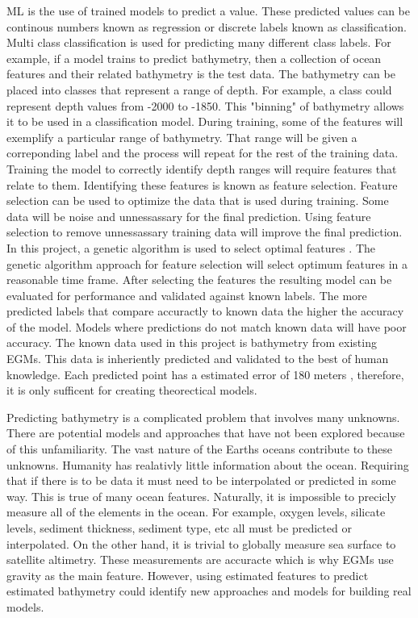 \par
\ac{ML} is the use of trained models to predict a value.
These predicted values can be continous numbers known as regression or discrete labels known as classification.
Multi class classification is used for predicting many different class labels.
For example, if a model trains to predict bathymetry, then a collection of ocean features and their related bathymetry is the test data.
The bathymetry can be placed into classes that represent a range of depth.
For example, a class could represent depth values from -2000 to -1850.
This "binning" of bathymetry allows it to be used in a classification model.
During training, some of the features will exemplify a particular range of bathymetry.
That range will be given a correponding label and the process will repeat for the rest of the training data.
Training the model to correctly identify depth ranges will require features that relate to them.
Identifying these features is known as feature selection.
Feature selection can be used to optimize the data that is used during training.
Some data will be noise and unnessassary for the final prediction.
Using feature selection to remove unnessassary training data will improve the final prediction.
In this project, a genetic algorithm is used to select optimal features \cite{yang1998feature}.
The genetic algorithm approach for feature selection will select optimum features in a reasonable time frame.
After selecting the features the resulting model can be evaluated for performance and validated against known labels.
The more predicted labels that compare accuractly to known data the higher the accuracy of the model.
Models where predictions do not match known data will have poor accuracy.
The known data used in this project is bathymetry from existing \ac{EGM}s.
This data is inheriently predicted and validated to the best of human knowledge.
Each predicted point has a estimated error of 180 meters \cite{becker2009global}, therefore, it is only sufficent for creating theorectical models.

\par
Predicting bathymetry is a complicated problem that involves many unknowns.
There are potential models and approaches that have not been explored because of this unfamiliarity.
The vast nature of the Earths oceans contribute to these unknowns.
Humanity has realativly little information about the ocean.
Requiring that if there is to be data it must need to be interpolated or predicted in some way.
This is true of many ocean features.
Naturally, it is impossible to precicly measure all of the elements in the ocean.
For example, oxygen levels, silicate levels, sediment thickness, sediment type, etc all must be predicted or interpolated.
On the other hand, it is trivial to globally measure sea surface to satellite altimetry.
These measurements are accuracte which is why \ac{EGM}s use gravity as the main feature.
However, using estimated features to predict estimated bathymetry could identify new approaches and models for building real models.

